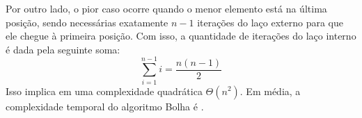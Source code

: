 Por outro lado, o pior caso ocorre quando o menor elemento está na última posição, sendo necessárias exatamente $n - 1$ iterações do laço externo para que ele chegue à primeira posição. Com isso, a quantidade de iterações do laço interno é dada pela seguinte soma:
\begin{equation}\label{eq:1}
    \sum_{i=1}^{n-1} i = \frac{n(n-1)}{2}
\end{equation}
Isso implica em uma complexidade quadrática $\Theta(n^2)$. Em média, a complexidade temporal do algoritmo Bolha é .
